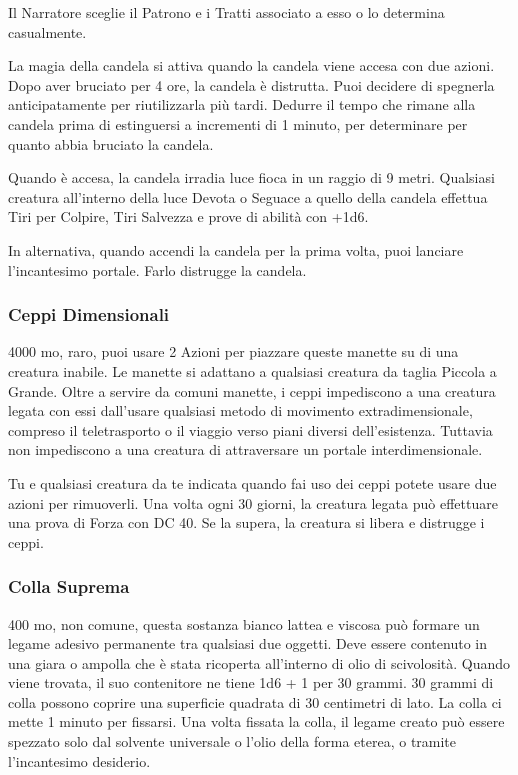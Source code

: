 \begin{multicols}{2}
Il Narratore sceglie il Patrono e i Tratti associato a esso o lo determina casualmente.

La magia della candela si attiva quando la candela viene accesa con due azioni. Dopo aver bruciato per 4 ore, la candela è distrutta. Puoi decidere di spegnerla anticipatamente per riutilizzarla più tardi. Dedurre il tempo che rimane alla candela prima di estinguersi a incrementi di 1 minuto, per determinare per quanto abbia bruciato la candela.

Quando è accesa, la candela irradia luce fioca in un raggio di 9 metri. Qualsiasi creatura all'interno della luce Devota o Seguace a quello della candela effettua Tiri per Colpire, Tiri Salvezza e prove di abilità con +1d6.

In alternativa, quando accendi la candela per la prima volta, puoi lanciare l'incantesimo portale. Farlo distrugge la candela.

\subsubsection*{Ceppi Dimensionali}
4000 mo, raro, puoi usare 2 Azioni per piazzare queste manette su di una creatura inabile. Le manette si adattano a qualsiasi creatura da taglia Piccola a Grande. Oltre a servire da comuni manette, i ceppi impediscono a una creatura legata con essi dall'usare qualsiasi metodo di movimento extradimensionale, compreso il teletrasporto o il viaggio verso piani diversi dell'esistenza. Tuttavia non impediscono a una creatura di attraversare un portale interdimensionale.

Tu e qualsiasi creatura da te indicata quando fai uso dei ceppi potete usare due azioni per rimuoverli. Una volta ogni 30 giorni, la creatura legata può effettuare una prova di Forza con DC 40. Se la supera, la creatura si libera e distrugge i ceppi.

\subsubsection*{Colla Suprema}
400 mo, non comune, questa sostanza bianco lattea e viscosa può formare un legame adesivo permanente tra qualsiasi due oggetti. Deve essere contenuto in una giara o ampolla che è stata ricoperta all'interno di olio di scivolosità. Quando viene trovata, il suo contenitore ne tiene 1d6 + 1 per 30 grammi. 30 grammi di colla possono coprire una superficie quadrata di 30 centimetri di lato. La colla ci mette 1 minuto per fissarsi. Una volta fissata la colla, il legame creato può essere spezzato solo dal solvente universale o l'olio della forma eterea, o tramite l'incantesimo desiderio.


\end{multicols}
